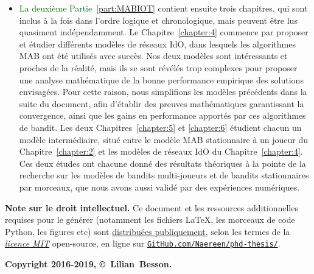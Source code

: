 \begin{resume_fr}
\begin{itemize}
    \item
\textcolor{darkgreen}{La deuxième Partie~\ref{part:MABIOT}} contient ensuite trois chapitres, qui sont inclus à la fois dans l'ordre logique et chronologique, mais peuvent être lus quasiment indépendamment.
Le Chapitre~\ref{chapter:4} commence par proposer et étudier différents modèles de réseaux IdO, dans lesquels les algorithmes MAB ont été utilisés avec succès. Nos deux modèles sont intéressants et proches de la réalité, mais ils se sont révélés trop complexes pour proposer une analyse mathématique de la bonne performance empirique des solutions envisagées.
Pour cette raison, nous simplifions les modèles précédents dans la suite du document,
afin d'établir des preuves mathématiques garantissant la convergence, ainsi que les gains en performance apportés par ces algorithmes de bandit.
Les deux Chapitres~\ref{chapter:5} et \ref{chapter:6} étudient chacun un modèle intermédiaire, situé entre le modèle MAB stationnaire à un joueur du Chapitre~\ref{chapter:2} et les modèles de réseaux IdO du Chapitre~\ref{chapter:4}.
Ces deux études ont chacune donné des résultats théoriques à la pointe de la recherche sur les modèles de bandits multi-joueurs et de bandits stationnaires par morceaux, que nous avons aussi validé par des expériences numériques.

\end{itemize}


\vfill{}

\textbf{Note sur le droit intellectuel.}
%
Ce document et les ressources additionnelles requises pour le générer (notamment les fichiers \LaTeX, les morceaux de code Python, les figures etc)
sont \href{https://github.com/Naereen/phd-thesis/}{distribuées publiquement},
selon les termes de la \href{https://lbesson.mit-license.org/}{\emph{licence MIT}} open-source,
en ligne sur \href{https://github.com/Naereen/phd-thesis/}{\texttt{GitHub.com/Naereen/phd-thesis/}}.


\begin{center}
    \textbf{Copyright 2016-2019, \copyright ~Lilian~Besson.}
\end{center}


\end{resume_fr}
